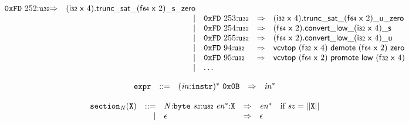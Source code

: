 $$\begin{array}{@{}l@{}rrlll@{}l@{}}
\mathtt{0xFD}~252{:}{\mathtt{u{\scriptstyle32}}} &\Rightarrow& (\mathsf{i{\scriptstyle32}}~\mathsf{x}~4) . {{{{{{\mathsf{trunc\_sat}}{\mathsf{\_}}}{(\mathsf{f{\scriptstyle64}}~\mathsf{x}~2)}}{\mathsf{\_}}}{\mathsf{s}}}{\mathsf{\_}}}{\mathsf{zero}} \\ &&|&
\mathtt{0xFD}~253{:}{\mathtt{u{\scriptstyle32}}} &\Rightarrow& (\mathsf{i{\scriptstyle32}}~\mathsf{x}~4) . {{{{{{\mathsf{trunc\_sat}}{\mathsf{\_}}}{(\mathsf{f{\scriptstyle64}}~\mathsf{x}~2)}}{\mathsf{\_}}}{\mathsf{u}}}{\mathsf{\_}}}{\mathsf{zero}} \\ &&|&
\mathtt{0xFD}~254{:}{\mathtt{u{\scriptstyle32}}} &\Rightarrow& (\mathsf{f{\scriptstyle64}}~\mathsf{x}~2) . {{{{{{\mathsf{convert}}{\mathsf{\_}}}{\mathsf{low}}}{\mathsf{\_}}}{(\mathsf{i{\scriptstyle32}}~\mathsf{x}~4)}}{\mathsf{\_}}}{\mathsf{s}} \\ &&|&
\mathtt{0xFD}~255{:}{\mathtt{u{\scriptstyle32}}} &\Rightarrow& (\mathsf{f{\scriptstyle64}}~\mathsf{x}~2) . {{{{{{\mathsf{convert}}{\mathsf{\_}}}{\mathsf{low}}}{\mathsf{\_}}}{(\mathsf{i{\scriptstyle32}}~\mathsf{x}~4)}}{\mathsf{\_}}}{\mathsf{u}} \\ &&|&
\mathtt{0xFD}~94{:}{\mathtt{u{\scriptstyle32}}} &\Rightarrow& \mathsf{vcvtop}~(\mathsf{f{\scriptstyle32}}~\mathsf{x}~4)~\mathsf{demote}~(\mathsf{f{\scriptstyle64}}~\mathsf{x}~2)~\mathsf{zero} \\ &&|&
\mathtt{0xFD}~95{:}{\mathtt{u{\scriptstyle32}}} &\Rightarrow& \mathsf{vcvtop}~(\mathsf{f{\scriptstyle64}}~\mathsf{x}~2)~\mathsf{promote}~\mathsf{low}~(\mathsf{f{\scriptstyle32}}~\mathsf{x}~4) \\ &&|&
\dots \\
\end{array}
$$

\vspace{1ex}

$$
\begin{array}{@{}l@{}rrlll@{}l@{}}
& {\mathtt{expr}} &::=& {({\mathit{in}}{:}{\mathtt{instr}})^\ast}~\mathtt{0x0B} &\Rightarrow& {{\mathit{in}}^\ast} \\
\end{array}
$$

\vspace{1ex}

\vspace{1ex}

$$
\begin{array}{@{}l@{}rrlll@{}l@{}}
& {{\mathtt{section}}}_{{\mathit{N}}}({\mathtt{X}}) &::=& {\mathit{N}}{:}{\mathtt{byte}}~{\mathit{sz}}{:}{\mathtt{u{\scriptstyle32}}}~{{\mathit{en}}^\ast}{:}{\mathtt{X}} &\Rightarrow& {{\mathit{en}}^\ast} &\quad
  \mbox{if}~{\mathit{sz}} = ||{\mathtt{X}}|| \\ &&|&
\epsilon &\Rightarrow& \epsilon \\
\end{array}
$$

